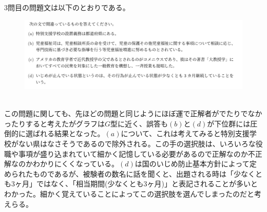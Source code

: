 \documentclass[12pt]{jarticle}
\begin{document}
$3$問目の問題文は以下のとおりである。\\
\hrulefill
\vspace{4.5cm}
\begin{figure}[H]
  \includegraphics[bb = -7 60 1 1,scale = 0.4]{ques_2.png}
\end{figure}
\hrulefill\\
この問題に関しても、先ほどの問題と同じようにほぼ運で正解者がでたりでなかったりすると考えたがグラフは$G$型に近く、誤答も$(b)$と$(d)$が下位群には圧倒的に選ばれる結果となった。$(a)$について、これは考えてみると特別支援学校がない県はなさそうであるので除外される。この手の選択肢は、いろいろな役職や事項が盛り込まれていて細かく記憶している必要があるので正解なのか不正解なのかわかりにくくなっている。$(d)$は国のいじめ防止基本方針によって定められたものであるが、被験者の数名に話を聞くと、出題される時は「少なくとも$3$ヶ月」ではなく、「相当期間(少なくとも$3$ヶ月)」と表記されることが多いとわかった。細かく覚えていることによってこの選択肢を選んでしまったのだと考えらる。
\end{document}
